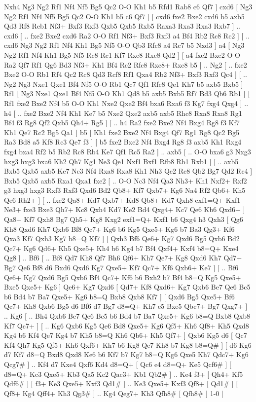 Nxh4  Ng3 Ng2  Rf1 Nf4  Nf5 Bg5  Qc2 O-O  Kh1 b5  Rfd1 Rab8  c6 Qf7   ]  cxd6 [  Ng3 Ng2  Rf1 Nf4  Nf5 Bg5  Qc2 O-O  Kh1 b5  c6 Qf7   ]  [  cxd6 fxe2  Bxe2 cxd6  b5 axb5  Qd3 Rf8  Reb1 Nf3+  Bxf3 Rxf3  Qxb5 Qxb5  Rxb5 Raxa3  Rxa3 Rxa3  Rxb7   ] .. cxd6 [ .. fxe2  Bxe2 cxd6  Ra2 O-O  Rf1 Nf3+  Bxf3 Rxf3  a4 Bf4  Rb2 Rc8  Rc2   ]  [ .. cxd6  Ng3 Ng2  Rf1 Nf4  Kh1 Bg5  Nf5 O-O  Qb3 Rfc8  a4 Rc7  b5 Nxd3   ]  a4 [  Ng3 Ng2  Rf1 Nf4  Kh1 Bg5  Nf5 Rc8  Rc1 Kf7  Rxc8 Rxc8  Qd2   ]  [  a4 fxe2  Bxe2 O-O  Ra2 Qf7  Rf1 Qg6  Bd3 Nf3+  Kh1 Bf4  Rc2 Rfc8  Rxc8+ Rxc8  b5   ] .. Ng2 [ .. fxe2  Bxe2 O-O  Rb1 Rf4  Qc2 Rc8  Qd3 Rcf8  Rf1 Qxa4  Rb2 Nf3+  Bxf3 Rxf3  Qc4   ]  [ .. Ng2  Ng3 Nxe1  Qxe1 Bf4  Nf5 O-O  Rb1 Qc7  Qf1 Rfc8  Qe1 Kh7  b5 axb5  Bxb5   ]  Rf1 [  Ng3 Nxe1  Qxe1 Bf4  Nf5 O-O  Kh1 Qd8  b5 axb5  Bxb5 Rf7  Bd3 Qb6  Rb1   ]  [  Rf1 fxe2  Bxe2 Nf4  b5 O-O  Kh1 Nxe2  Qxe2 Bf4  bxa6 Rxa6  f3 Kg7  fxg4 Qxg4   ] .. h4 [ .. fxe2  Bxe2 Nf4  Kh1 Ke7  b5 Nxe2  Qxe2 axb5  axb5 Rhc8  Rxa8 Rxa8  Rg1 Bf4  f3 Rg8  Qf2 Qxb5  Qh4+ Rg5   ]  [ .. h4  Ra2 fxe2  Bxe2 Nf4  Bxg4 Rg8  f3 Kf7  Kh1 Qe7  Rc2 Bg5  Qa1   ]  b5 [  Kh1 fxe2  Bxe2 Nf4  Bxg4 Qf7  Rg1 Rg8  Qc2 Bg5  Ra3 Bd8  a5 Kf8  Rc3 Qe7  f3   ]  [  b5 fxe2  Bxe2 Nf4  Bxg4 Rg8  f3 axb5  Kh1 Rxg4  fxg4 bxa4  Rf2 b5  Rb2 Rc8  Rb4 Ke7  Qf1 Rc5  Ra2   ] .. axb5 [ .. O-O  bxa6 g3  Nxg3 hxg3  hxg3 bxa6  Kh2 Qh7  Kg1 Ne3  Qe1 Nxf1  Bxf1 Rfb8  Rb1 Rxb1   ]  [ .. axb5  Bxb5 Qxb5  axb5 Ke7  Nc3 Nf4  Rxa8 Rxa8  Kh1 Nh3  Qc2 Rc8  Qb2 Bg7  Qd2 Rc4   ]  Bxb5   Qxb5    axb5   Rxa1    Qxa1   fxe2 [ .. O-O  Nc3 Nf4  Qa3 Nh3+  Kh1 Nxf2+  Rxf2 g3  hxg3 hxg3  Rxf3 Rxf3  Qxd6 Bd2  Qb8+ Kf7  Qxb7+ Kg6  Na4 Rf2  Qb6+ Kh5  Qe6 Rh2+   ]  [ .. fxe2  Qa8+ Kd7  Qxb7+ Kd8  Qb8+ Kd7  Qxh8 exf1=Q+  Kxf1 Ne3+  fxe3 Bxe3  Qh7+ Kc8  Qxh4 Kd7  Ke2 Bd4  Qxg4+ Kc7  Qe6 Kb6  Qxd6+   ]  Qa8+   Kf7    Qxh8   Bg7    Qh5+   Kg8    Kxg2   exf1=Q+    Kxf1   b6    Qxg4   h3    Qxh3 [  Qg6 Kh8  Qxd6 Kh7  Qxb6 Bf8  Qc7+ Kg6  b6 Kg5  Qxe5+ Kg6  b7 Ba3  Qg3+ Kf6  Qxa3 Kf7  Qxh3 Kg7  b8=Q Kf7   ]  [  Qxh3 Bf6  Qe6+ Kg7  Qxd6 Bg5  Qxb6 Bd2  Qc7+ Kg6  Qd6+ Kh5  Qxe5+ Kh4  b6 Kg4  b7 Bf4  Qxf4+ Kxf4  b8=Q+ Kxe4  Qg8   ] .. Bf6 [ .. Bf8  Qd7 Kh8  Qf7 Bh6  Qf6+ Kh7  Qe7+ Kg8  Qxd6 Kh7  Qd7+ Bg7  Qe6 Bf8  d6 Bxd6  Qxd6 Kg7  Qxe5+ Kf7  Qc7+ Kf6  Qxb6+ Ke7   ]  [ .. Bf6  Qe6+ Kg7  Qxd6 Bg5  Qxb6 Bf4  Qc7+ Kf6  b6 Bxh2  b7 Bf4  b8=Q Kg5  Qxe5+ Bxe5  Qxe5+ Kg6   ]  Qe6+   Kg7    Qxd6 [  Qd7+ Kf8  Qxd6+ Kg7  Qxb6 Be7  Qe6 Bc5  b6 Bd4  b7 Ba7  Qxe5+ Kg6  b8=Q Bxb8  Qxb8 Kf7   ]  [  Qxd6 Bg5  Qxe5+ Bf6  Qc7+ Kh8  Qxb6 Bg5  d6 Bf6  d7 Bg7  d8=Q+ Kh7  e5 Bxe5  Qbc7+ Bg7  Qxg7+   ] .. Kg6 [ .. Bh4  Qxb6 Be7  Qe6 Bc5  b6 Bd4  b7 Ba7  Qxe5+ Kg6  b8=Q Bxb8  Qxb8 Kf7  Qc7+   ]  [ .. Kg6  Qxb6 Kg5  Qe6 Bd8  Qxe5+ Kg6  Qf5+ Kh6  Qf8+ Kh5  Qxd8 Kg4  b6 Kf4  Qe7 Kg4  b7 Kh5  b8=Q Kh6  Qb6+ Kh5  Qf7+   ]  Qxb6   Kg5    d6 [  Qc7 Kf4  Qh7 Kg5  Qf5+ Kh6  Qxf6+ Kh7  b6 Kg8  Qe7 Kh8  b7 Kg8  b8=Q#   ]  [  d6 Kg6  d7 Kf7  d8=Q Bxd8  Qxd8 Ke6  b6 Kf7  b7 Kg7  b8=Q Kg6  Qxe5 Kh7  Qdc7+ Kg6  Qcg7#   ] .. Kf4    d7   Kxe4    Qxf6   Kd4    d8=Q+ [  Qc6 e4  d8=Q+ Ke5  Qcf6#   ]  [  d8=Q+ Kc3  Qxe5+ Kb3  Qa5 Kc2  Qac3+ Kb1  Qb2#   ] .. Ke4    f3+ [  Qh4+ Kf5  Qdf6#   ]  [  f3+ Ke3  Qxe5+ Kxf3  Qd1#   ] .. Ke3    Qxe5+   Kxf3    Qf8+ [  Qd1#   ]  [  Qf8+ Kg4  Qff4+ Kh3  Qg3#   ] .. Kg4    Qeg7+   Kh3    Qfh8#    [  Qfh8#   ] 1-0  |
